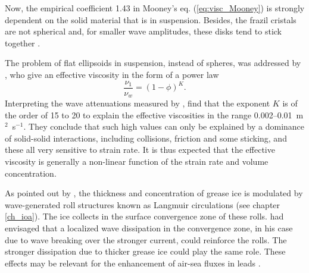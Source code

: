  
 Now, the empirical coefficient 1.43 in Mooney's eq. (\ref{eq:visc_Mooney}) is strongly dependent on the solid material that is in suspension. 
Besides, the frazil cristals are not spherical and, for smaller wave amplitudes, these disks tend to stick together \citep{Martin&Kauffman1981}. 

The problem of flat ellipsoids in suspension, instead of spheres, was addressed by \cite{deCarolis&al.2005}, who give an effective viscosity in the form of a power law  
\begin{equation}
\frac{\nu_1}{\nu_w} = (1- \phi)^K.
\end{equation}
Interpreting the wave attenuations measured by \cite{Martin&Kauffman1981}, \cite{deCarolis&al.2005} find 
that the exponent $K$ is of the order of 15 to 20 to explain the effective viscosities in the range 0.002--0.01~m$^2$~s$^{-1}$. They conclude that such high values can only be explained by a dominance of solid-solid interactions, including 
collisions, friction and some sticking, and these all very sensitive to strain rate. It is thus expected that the effective viscosity is generally a non-linear function of the strain rate and volume concentration. 

As pointed out by \cite{Martin&Kauffman1981}, the thickness and concentration of grease ice is modulated by wave-generated roll structures known as Langmuir circulations (see chapter \ref{ch_ioa}). The ice collects in the surface convergence zone of these rolls. \cite{Garrett1976} had envisaged that a  localized wave dissipation in the convergence zone, in his case due to wave breaking over the stronger current, could reinforce the rolls. The stronger dissipation due to thicker grease ice could play the same role. These effects may be relevant for the enhancement of air-sea fluxes in leads \citep{Esau2007}.




